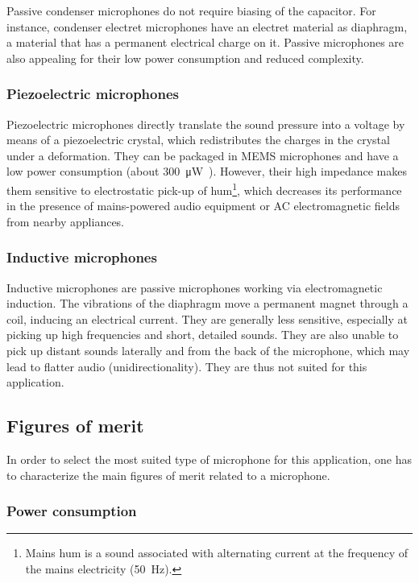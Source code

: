 \documentclass{EPL-master-thesis-covers-EN}
\begin{document}
Passive condenser microphones do not require biasing of the capacitor. For instance, condenser electret microphones have an electret material as diaphragm, a material that has a permanent electrical charge on it. Passive microphones are also appealing for their low power consumption and reduced complexity.
 
\subsubsection*{Piezoelectric microphones}

Piezoelectric microphones directly translate the sound pressure into a voltage by means of a piezoelectric crystal, which redistributes the charges in the crystal under a deformation. They can be packaged in MEMS microphones and have a low power consumption (about \SI{300}{\micro W}~\cite{PMM-3738-VM1000-R}). However, their high impedance makes them sensitive to electrostatic pick-up of hum\footnote{Mains hum is a sound associated with alternating current at the frequency of the mains electricity (\SI{50}{Hz}).}, which decreases its performance in the presence of mains-powered audio equipment or AC electromagnetic fields from nearby appliances.

\subsubsection*{Inductive microphones}

Inductive microphones are passive microphones working via electromagnetic induction. The vibrations of the diaphragm move a permanent magnet through a coil, inducing an electrical current. They are generally less sensitive, especially at picking up high frequencies and short, detailed sounds. They are also unable to pick up distant sounds laterally and from the back of the microphone, which may lead to flatter audio (unidirectionality). They are thus not suited for this application.


\subsection*{Figures of merit}

In order to select the most suited type of microphone for this application, one has to characterize the main figures of merit related to a microphone.

\subsubsection*{Power consumption}
\end{document}
